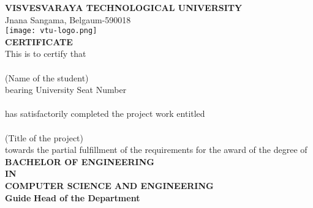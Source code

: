 \documentclass[12pt, a4paper]{report}
\begin{document}
	
	\begin{titlepage}
		\begin{center}
			\textbf{{\large VISVESVARAYA TECHNOLOGICAL UNIVERSITY}}\\
			{\normalsize Jnana Sangama, Belgaum-590018}\\
			\vspace{0.5in}
			\texttt{[image: vtu-logo.png]}\\
			\vspace{0.5in}
			\textbf{CERTIFICATE}\\
			\vspace{0.3in}
			This is to certify that \\
			\vspace{0.2in}
			\underline{\hspace{10cm}}\\
			\vspace{0.2in}
			(Name of the student)\\
			\vspace{0.2in}
			bearing University Seat Number \\
			\vspace{0.2in}
			\underline{\hspace{10cm}}\\
			\vspace{0.2in}
			has satisfactorily completed the project work entitled \\
			\vspace{0.2in}
			\underline{\hspace{10cm}}\\
			\vspace{0.2in}
			(Title of the project)\\
			\vspace{0.2in}
			towards the partial fulfillment of the requirements for the award of the degree of\\
			\vspace{0.2in}
			\textbf{BACHELOR OF ENGINEERING\\IN\\COMPUTER SCIENCE AND ENGINEERING}\\
			\vspace{0.5in}
			\textbf{Guide} \hspace{3.5in} \textbf{Head of the Department}\\
			\vspace{0.3in}
			\underline{\hspace{6cm}} \hspace{1.5in} \underline{\hspace{6cm}}\\

\end{center}
\end{titlepage}
\end{document}

